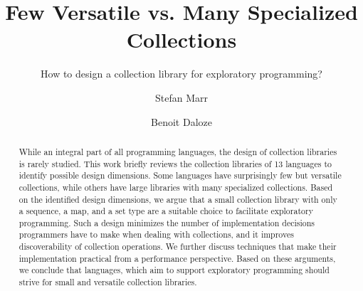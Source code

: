 \documentclass[sigconf, 10pt]{acmart}
\def\Title{Few Versatile vs. Many Specialized Collections}
\def\SubTitle{How to design a collection library for exploratory programming?}
\begin{document}
\title{\Title}
\subtitle{\SubTitle}

\author{Stefan Marr}

\author{Benoit Daloze}




\begin{abstract}
While an integral part of all programming languages,
the design of collection libraries is rarely studied.
This work briefly reviews the collection libraries of 13 languages
to identify possible design dimensions.
Some languages have surprisingly few but versatile collections,
while others have large libraries with many specialized collections.
Based on the identified design dimensions,
we argue that a small collection library
with only a sequence, a map, and a set type
are a suitable choice to facilitate exploratory programming.
Such a design minimizes the number of implementation decisions programmers
have to make when dealing with collections,
and it improves discoverability of collection operations.
We further discuss
techniques
that make their implementation practical from a performance perspective.
Based on these arguments,
we conclude that languages, which aim to support exploratory programming
should strive for small and versatile collection libraries.
\end{abstract}
\end{document}
